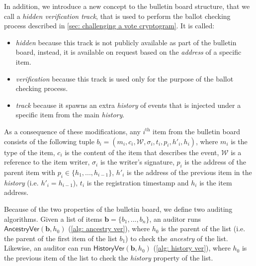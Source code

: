 In addition, we introduce a new concept to the bulletin board structure, that we call a \emph{hidden verification track}, that is used to perform the ballot checking process described in \cref{sec: challenging a vote cryptogram}. It is called:
\begin{itemize}
    \item \emph{hidden} because this track is not publicly available as part of the bulletin board, instead, it is available on request based on the \textit{address} of a specific item.
    \item \textit{verification} because this track is used only for the purpose of the ballot checking process.
    \item \emph{track} because it spawns an extra \textit{history} of events that is injected under a specific item from the main \textit{history}.
\end{itemize}

As a consequence of these modifications, any $i^\mathrm{th}$ item from the bulletin board consists of the following tuple $b_i = (m_i, c_i, \mathcal{W}, \sigma_i, t_i, p_i, h'_i, h_i)$, where $m_i$ is the type of the item, $c_i$ is the content of the item that describes the event, $\mathcal{W}$ is a reference to the item writer, $\sigma_i$ is the writer's signature, $p_i$ is the address of the parent item with $p_i \in \{h_1, ..., h_{i-1}\}$, $h'_i$ is the address of the previous item in the \textit{history} (i.e. $h'_i = h_{i-1}$), $t_i$ is the registration timestamp and $h_i$ is the item address.

Because of the two properties of the bulletin board, we define two auditing algorithms. Given a list of items $\boldsymbol{b} = \{ b_1, ..., b_n \}$, an auditor runs $\mathsf{AncestryVer}(\boldsymbol{b}, h_0)$ (\cref{alg: ancestry ver}), where $h_0$ is the parent of the list (i.e. the parent of the first item of the list $b_1$) to check the \textit{ancestry} of the list. Likewise, an auditor can run $\mathsf{HistoryVer}(\boldsymbol{b}, h_0)$ (\cref{alg: history ver}), where $h_0$ is the previous item of the list to check the \textit{history} property of the list.

\begin{algorithm}[ht]
    \DontPrintSemicolon
    \caption{$\mathsf{AncestryVer}(\boldsymbol{b}, h_0)$}
    \label{alg: ancestry ver}

     
\end{algorithm}

